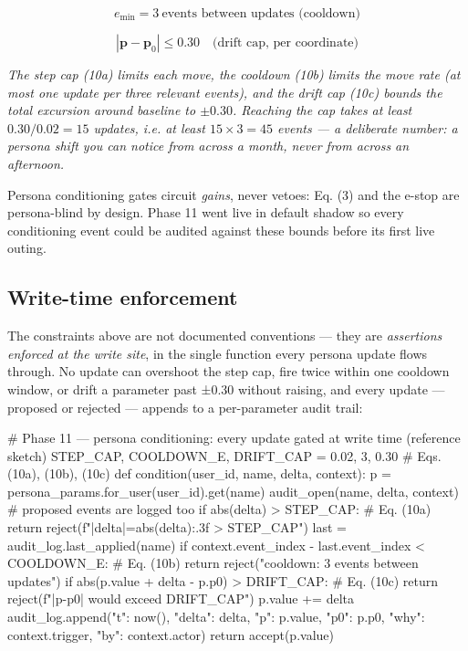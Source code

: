 \documentclass[11pt]{article}
\begin{document}
\begin{equation}
e_{\min} = 3\ \text{events between updates (cooldown)}
\tag{10b}
\end{equation}

\begin{equation}
|\mathbf{p} - \mathbf{p}_0| \le 0.30 \quad\text{(drift cap, per coordinate)}
\tag{10c}
\end{equation}

\noindent\emph{The step cap (10a) limits each move, the cooldown (10b) limits the move rate (at most one update per three relevant events), and the drift cap (10c) bounds the total excursion around baseline to \(\pm 0.30\). Reaching the cap takes at least \(0.30/0.02 = 15\) updates, i.e. at least \(15 \times 3 = 45\) events — a deliberate number: a persona shift you can notice from across a month, never from across an afternoon.}

Persona conditioning gates circuit \emph{gains}, never vetoes: Eq. (3) and the e-stop are persona-blind by design. Phase 11 went live in default shadow so every conditioning event could be audited against these bounds before its first live outing.

\subsection{Write-time enforcement}

The constraints above are not documented conventions — they are \emph{assertions enforced at the write site}, in the single function every persona update flows through. No update can overshoot the step cap, fire twice within one cooldown window, or drift a parameter past ±0.30 without raising, and every update — proposed or rejected — appends to a per-parameter audit trail:

\begin{CodeBlock}
# Phase 11 — persona conditioning: every update gated at write time (reference sketch)
STEP_CAP, COOLDOWN_E, DRIFT_CAP = 0.02, 3, 0.30   # Eqs. (10a), (10b), (10c)
def condition(user_id, name, delta, context):
    p = persona_params.for_user(user_id).get(name)
    audit_open(name, delta, context)              # proposed events are logged too
    if abs(delta) > STEP_CAP:                     # Eq. (10a)
        return reject(f"|delta|={abs(delta):.3f} > {STEP_CAP}")
    last = audit_log.last_applied(name)
    if context.event_index - last.event_index < COOLDOWN_E:   # Eq. (10b)
        return reject("cooldown: 3 events between updates")
    if abs(p.value + delta - p.p0) > DRIFT_CAP: # Eq. (10c)
        return reject(f"|p-p0| would exceed {DRIFT_CAP}")
    p.value += delta
    audit_log.append({"t": now(), "delta": delta, "p": p.value, "p0": p.p0,
                      "why": context.trigger, "by": context.actor})
    return accept(p.value)
\end{CodeBlock}
\end{document}
